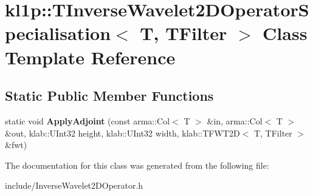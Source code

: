\hypertarget{classkl1p_1_1TInverseWavelet2DOperatorSpecialisation}{}\section{kl1p\+:\+:T\+Inverse\+Wavelet2\+D\+Operator\+Specialisation$<$ T, T\+Filter $>$ Class Template Reference}
\label{classkl1p_1_1TInverseWavelet2DOperatorSpecialisation}
\subsection*{Static Public Member Functions}
\begin{DoxyCompactItemize}
\item 
static void {\bfseries Apply\+Adjoint} (const arma\+::\+Col$<$ T $>$ \&in, arma\+::\+Col$<$ T $>$ \&out, klab\+::\+U\+Int32 height, klab\+::\+U\+Int32 width, klab\+::\+T\+F\+W\+T2D$<$ T, T\+Filter $>$ \&fwt)\hypertarget{classkl1p_1_1TInverseWavelet2DOperatorSpecialisation_af50b78128830df68353d6a9a98b29343}{}\label{classkl1p_1_1TInverseWavelet2DOperatorSpecialisation_af50b78128830df68353d6a9a98b29343}

\end{DoxyCompactItemize}


The documentation for this class was generated from the following file\+:\begin{DoxyCompactItemize}
\item 
include/Inverse\+Wavelet2\+D\+Operator.\+h\end{DoxyCompactItemize}
